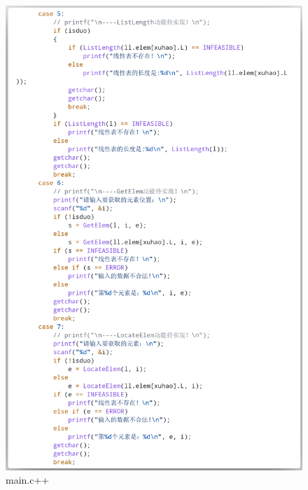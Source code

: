 \documentclass[supercite]{Experimental_Report}
\theoremstyle{definition}
\begin{document}
\begin{figure}[htb]
	\begin{center}
		\includegraphics[scale=0.30]{images/3-11.png}
		\caption{main.c++}
		\label{fig3-11}
	\end{center}
\end{figure}
\end{document}

